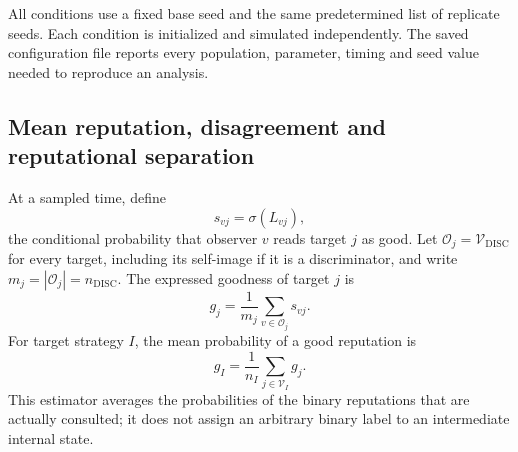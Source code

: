 \documentclass[fleqn,10pt]{wlscirep}
\begin{document}
All conditions use a fixed base seed and the same predetermined list of replicate seeds. Each condition is initialized and simulated independently. The saved configuration file reports every population, parameter, timing and seed value needed to reproduce an analysis.

\subsection{Mean reputation, disagreement and reputational separation}
\label{sec:si-finite-estimators}

At a sampled time, define
\[
s_{vj}=\sigma(L_{vj}),
\]
the conditional probability that observer $v$ reads target $j$ as good. Let $\mathcal O_j=\mathcal V_{\mathrm{DISC}}$ for every target, including its self-image if it is a discriminator, and write $m_j=|\mathcal O_j|=n_{\mathrm{DISC}}$. The expressed goodness of target $j$ is
\[
g_j=\frac{1}{m_j}\sum_{v\in\mathcal O_j}s_{vj}.
\]
For target strategy $I$, the mean probability of a good reputation is
\begin{equation}
g_I=\frac{1}{n_I}\sum_{j\in\mathcal V_I}g_j.
\label{eq:si-finite-goodness}
\end{equation}
This estimator averages the probabilities of the binary reputations that are actually consulted; it does not assign an arbitrary binary label to an intermediate internal state.
\end{document}
